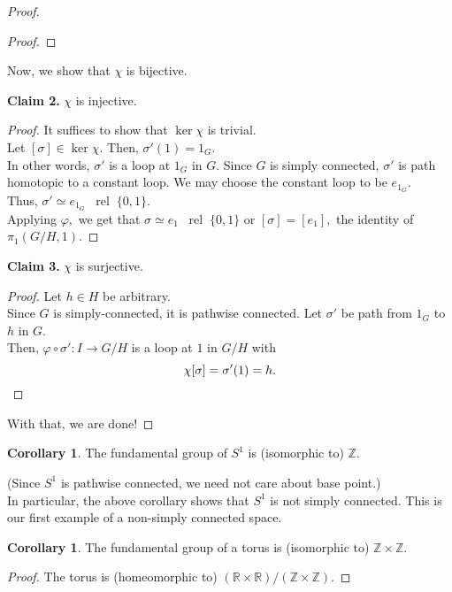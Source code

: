 \documentclass[12pt]{article}
\theoremstyle{definition}
\numberwithin{thm}{section}
\newtheorem{cor}[thm]{Corollary}
\newcommand{\rel}{\;\;\operatorname{rel}\;}
\newenvironment{blockquote}
{\begin{mdframed}[skipabove=0pt, skipbelow=0pt, innertopmargin=4pt, innerbottommargin=4pt, bottomline=false,topline=false,rightline=false, linewidth=2pt]}
{\end{mdframed}}
\begin{document}
\begin{proof}
\begin{blockquote}
\begin{proof}
		\end{proof}
	\end{blockquote}
	Now, we show that $\chi$ is bijective.
	\begin{blockquote}
		\textbf{Claim 2.} $\chi$ is injective.
		\begin{proof} 
			It suffices to show that $\ker \chi$ is trivial.\\
			Let $[\sigma] \in \ker\chi.$ Then, $\sigma'(1) = 1_G.$\\
			In other words, $\sigma'$ is a loop at $1_G$ in $G.$ Since $G$ is simply connected, $\sigma'$ is path homotopic to a constant loop. We may choose the constant loop to be $e_{1_G}.$\\
			Thus, $\sigma' \simeq e_{1_G} \rel \{0, 1\}.$\\
			Applying $\varphi,$ we get that $\sigma \simeq e_1 \rel \{0, 1\}$ or $[\sigma] = [e_1],$ the identity of $\pi_1(G/H, 1).$	
		\end{proof}
	\end{blockquote}
	\begin{blockquote}
		\textbf{Claim 3.} $\chi$ is surjective.	
		\begin{proof} 
			Let $h \in H$ be arbitrary.\\
			Since $G$ is simply-connected, it is pathwise connected. Let $\sigma'$ be path from $1_G$ to $h$ in $G.$\\
			Then, $\varphi\circ\sigma':I\to G/H$ is a loop at $1$ in $G/H$ with
			\begin{equation*} 
				\chi[\sigma] = \sigma'(1) = h. \qedhere
			\end{equation*}
		\end{proof}
	\end{blockquote}
	With that, we are done!
\end{proof}
\begin{cor}
	The fundamental group of $S^1$ is (isomorphic to) $\mathbb{Z}.$
\end{cor}
(Since $S^1$ is pathwise connected, we need not care about base point.)\\
In particular, the above corollary shows that $S^1$ is not simply connected. This is our first example of a non-simply connected space.
\begin{cor}
	The fundamental group of a torus is (isomorphic to) $\mathbb{Z} \times \mathbb{Z}.$
\end{cor}
\begin{proof} 
	The torus is (homeomorphic to) $(\mathbb{R} \times \mathbb{R})/(\mathbb{Z} \times \mathbb{Z}).$
\end{proof}
\end{document}
